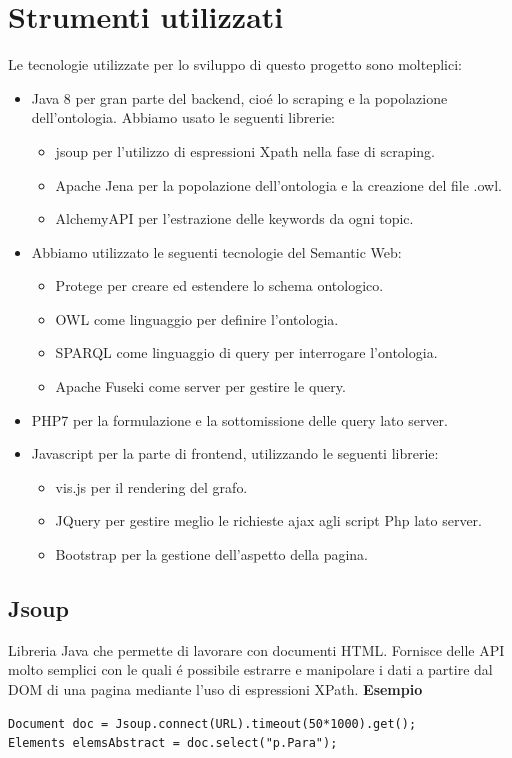 \documentclass[11pt,a4paper]{article}
\begin{document}
\section{Strumenti utilizzati}
\label{sec:tools}
Le tecnologie utilizzate per lo sviluppo di questo progetto sono molteplici:
\begin{itemize}
	\item Java 8 per gran parte del backend, cio\'e lo scraping e la popolazione dell'ontologia. Abbiamo usato le seguenti librerie:
	\begin{itemize}
		\item jsoup per l'utilizzo di espressioni Xpath nella fase di scraping.
		\item Apache Jena per la popolazione dell'ontologia e la creazione del file .owl.
		\item AlchemyAPI per l'estrazione delle keywords da ogni topic.
	\end{itemize}
	\item Abbiamo utilizzato le seguenti tecnologie del Semantic Web:
	\begin{itemize}
		\item Protege per creare ed estendere lo schema ontologico.
		\item OWL come linguaggio per definire l'ontologia.
		\item SPARQL come linguaggio di query per interrogare l'ontologia.
		\item Apache Fuseki come server per gestire le query.
	\end{itemize}
	\item PHP7 per la formulazione e la sottomissione delle query lato server.
	\item Javascript per la parte di frontend, utilizzando le seguenti librerie:
	\begin{itemize}
		\item vis.js per il rendering del grafo.
		\item JQuery per gestire meglio le richieste ajax agli script Php lato server.
		\item Bootstrap per la gestione dell'aspetto della pagina.
	\end{itemize}
\end{itemize}

\subsection{Jsoup}
Libreria Java che permette di lavorare con documenti HTML. Fornisce delle API molto semplici con le quali \'e possibile estrarre e manipolare i dati a partire dal DOM di una pagina mediante l'uso di espressioni XPath. 
\newline \newline 
\textbf  {Esempio}
\begin{lstlisting}[breaklines=true]
Document doc = Jsoup.connect(URL).timeout(50*1000).get();
Elements elemsAbstract = doc.select("p.Para");
\end{lstlisting} 
\end{document}
